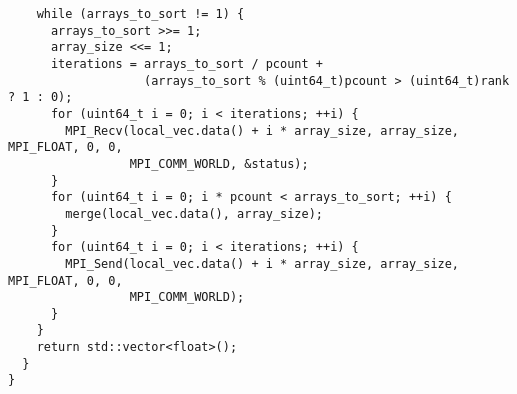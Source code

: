 \documentclass[14pt, a4paper]{extarticle}
\begin{document}
\begin{lstlisting}
    while (arrays_to_sort != 1) {
      arrays_to_sort >>= 1;
      array_size <<= 1;
      iterations = arrays_to_sort / pcount +
                   (arrays_to_sort % (uint64_t)pcount > (uint64_t)rank ? 1 : 0);
      for (uint64_t i = 0; i < iterations; ++i) {
        MPI_Recv(local_vec.data() + i * array_size, array_size, MPI_FLOAT, 0, 0,
                 MPI_COMM_WORLD, &status);
      }
      for (uint64_t i = 0; i * pcount < arrays_to_sort; ++i) {
        merge(local_vec.data(), array_size);
      }
      for (uint64_t i = 0; i < iterations; ++i) {
        MPI_Send(local_vec.data() + i * array_size, array_size, MPI_FLOAT, 0, 0,
                 MPI_COMM_WORLD);
      }
    }
    return std::vector<float>();
  }
}


	\end{lstlisting}
	\newpage
\end{document}
